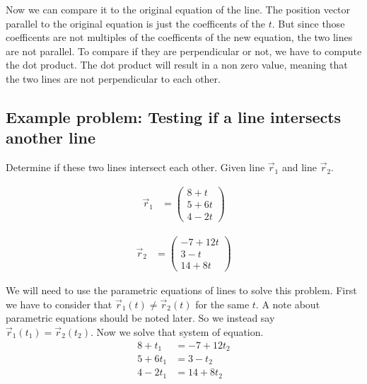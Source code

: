 Now we can compare it to the original equation of the line. The position vector parallel to the original equation is just 
the coefficents of the $t$. But since those coefficents are not multiples of the coefficents of the new equation, the two lines are not parallel. 
To compare if they are perpendicular or not, we have to compute the dot product. The dot product will result in a non zero value, meaning that the two lines are not 
perpendicular to each other.

\subsection{Example problem: Testing if a line intersects another line} 

Determine if these two lines intersect each other. Given line $\vec{r}_1$ and line $\vec{r}_2$.

\begin{align*}
	\vec{r}_1 &= \begin{pmatrix} 
		8 + t \\ 
		5 + 6t \\ 
		4 - 2t 
	\end{pmatrix} 
\end{align*}

\begin{align*}
	\vec{r}_2 &= \begin{pmatrix}
		-7 + 12t \\ 
		3 - t \\ 
		14 + 8t 
	\end{pmatrix}
\end{align*}

We will need to use the parametric equations of lines to solve this problem. First we have to consider that $\vec{r}_1(t) \neq \vec{r}_2(t)$ for the same 
$t$. A note about parametric equations should be noted later. So we instead say $\vec{r}_1(t_1) = \vec{r}_2(t_2)$. Now we solve that system of  
equation.
\begin{align*}
	8 + t_1 &= -7 + 12t_2 \\
	5 + 6t_1 &= 3 - t_2 \\ 
	4-2t_1 &= 14 + 8t_2 	
\end{align*} 